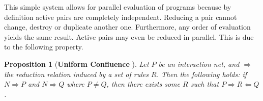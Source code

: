 \documentclass[submission,copyright,creativecommons]{eptcs}
\begin{document}
This simple system allows for parallel evaluation of programs because by
definition active pairs are completely independent. Reducing a
pair cannot change, destroy or duplicate another one. Furthermore, any order of evaluation yields the same
result. Active pairs may even be reduced in parallel. This is due to the
following property.

\newtheorem{def:ucr}{Proposition}[subsection]

\begin{def:ucr} [\textbf{Uniform Confluence} \cite{lafont_interaction_1990}]
Let $P$ be an interaction net, and
$\Rightarrow$ the reduction relation induced by a set of rules $R$. Then the
following holds: if $N \Rightarrow P$ and $N \Rightarrow Q$ where $P \neq Q$,
then there exists some $R$ such that $P \Rightarrow R \Leftarrow Q$.%
\end{def:ucr}

\newtheorem{exp:addition_reduction}[def:ucr]{Example}
\end{document}
